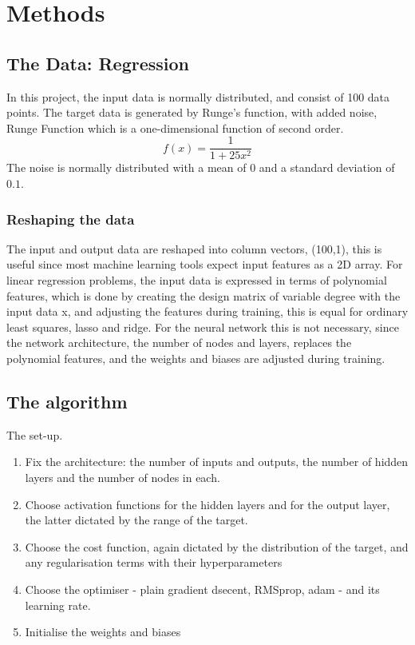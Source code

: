 \section{Methods}
\label{sec:methods}
\subsection{The Data: Regression}
In this project, the input data is normally distributed, and consist of 100 data points.
The target data is generated by Runge's function, with added noise,
Runge Function which is a one-dimensional function of second order.
\[
  f(x) = \frac{1}{1 + 25x^2}
\]
The noise is normally distributed with a mean of 0 and a 
standard deviation of $0.1$.  
\subsubsection{Reshaping the data}
The input and output data are reshaped into column vectors, (100,1),
this is useful since most machine learning tools expect input features
as a 2D array. \cite{Codex} 
For linear regression problems, the input data is expressed
in terms of polynomial features, which is done
by creating the design matrix of variable degree with the input data x,
and adjusting the features during training, this is equal for ordinary least squares, lasso and ridge. 
For the neural network this is not necessary, since the network architecture,
the number of nodes and layers, replaces the polynomial features, and the 
weights and biases are adjusted during training.  
\subsection{The algorithm}
The set-up.
\begin{enumerate}
    \item Fix the architecture: the number of inputs and outputs,
    the number of hidden layers and the number of nodes in each.
    \item Choose activation functions for the hidden layers and for the
    output layer, the latter dictated by the range of the target.
    \item Choose the cost function, again dictated by the distribution of the target,
    and any regularisation terms with their hyperparameters
    \item Choose the optimiser - plain gradient dsecent, RMSprop, adam -
    and its learning rate.
    \item Initialise the weights and biases
\end{enumerate}

